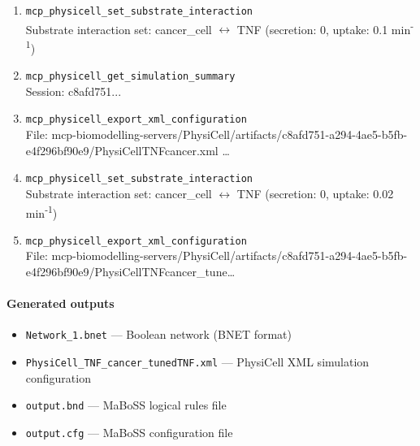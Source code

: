\begin{enumerate}
\RaggedRight PhysiBoSS output: CCND1 \ensuremath{\rightarrow} cycle entry
\item[29.] \texttt{mcp\_\allowbreak{}physicell\_\allowbreak{}set\_\allowbreak{}substrate\_\allowbreak{}interaction}
\hfill\\
\RaggedRight Substrate interaction set: cancer\_cell \ensuremath{\leftrightarrow} TNF (secretion: 0, uptake: 0.1 min\textsuperscript{-}\textsuperscript{1})
\item[30.] \texttt{mcp\_\allowbreak{}physicell\_\allowbreak{}get\_\allowbreak{}simulation\_\allowbreak{}summary}
\hfill\\
\RaggedRight Session: c8afd751...
\item[31.] \texttt{mcp\_\allowbreak{}physicell\_\allowbreak{}export\_\allowbreak{}xml\_\allowbreak{}configuration}
\hfill\\
\RaggedRight File: mcp-biomodelling-servers/PhysiCell/artifacts/c8afd751-a294-4ae5-b5fb-e4f296bf90e9/PhysiCellTNFcancer.xml \ldots{}
\item[32.] \texttt{mcp\_\allowbreak{}physicell\_\allowbreak{}set\_\allowbreak{}substrate\_\allowbreak{}interaction}
\hfill\\
\RaggedRight Substrate interaction set: cancer\_cell \ensuremath{\leftrightarrow} TNF (secretion: 0, uptake: 0.02 min\textsuperscript{-}\textsuperscript{1})
\item[33.] \texttt{mcp\_\allowbreak{}physicell\_\allowbreak{}export\_\allowbreak{}xml\_\allowbreak{}configuration}
\hfill\\
\RaggedRight File: mcp-biomodelling-servers/PhysiCell/artifacts/c8afd751-a294-4ae5-b5fb-e4f296bf90e9/PhysiCellTNFcancer\_tune\ldots{}
\end{enumerate}
\endgroup

\paragraph{Generated outputs}
\begin{itemize}
\item \texttt{Network\_\allowbreak{}1.\allowbreak{}bnet} — Boolean network (BNET format)
\item \texttt{PhysiCell\_\allowbreak{}TNF\_\allowbreak{}cancer\_\allowbreak{}tunedTNF.\allowbreak{}xml} — PhysiCell XML simulation configuration
\item \texttt{output.\allowbreak{}bnd} — MaBoSS logical rules file
\item \texttt{output.\allowbreak{}cfg} — MaBoSS configuration file
\end{itemize}
